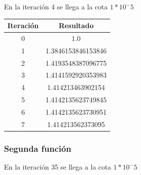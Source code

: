 \documentclass[titlepage,a4paper]{article}
\begin{document}
En la iteración 4 se llega a la cota $1*10^-5$

\begin{center}
    \begin{tabular}{| c | c |}
    \hline
     Iteración & Resultado \\ \hline
 0     &  1.0 \\
1     &  1.3846153846153846 \\
2     &  1.4193548387096775 \\
3     &  1.4141592920353983 \\
4     &  1.414213463902154 \\
5     &  1.4142135623749845 \\
6     &  1.4142135623730951 \\
7     &  1.414213562373095 \\
    \hline
    \end{tabular}
\end{center}

\subsubsection{Segunda función}\label{sec:sec2}
En la iteración 35 se llega a la cota $1*10^-5$
\end{document}
